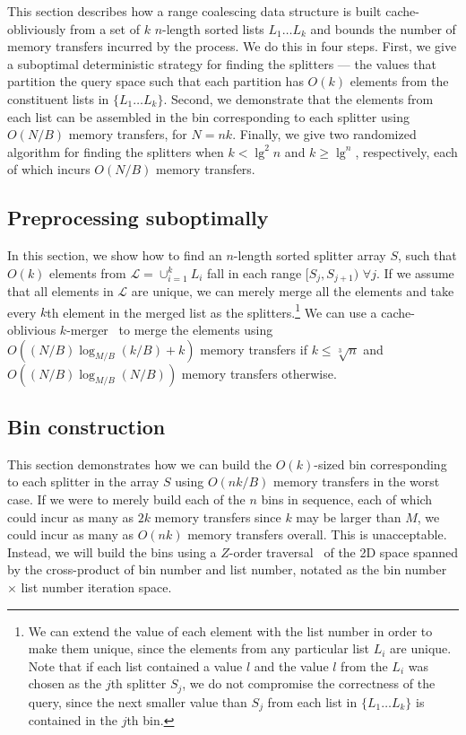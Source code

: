 
This section describes how a range coalescing data structure is built cache-obliviously
from a set of $k$ $n$-length sorted lists $L_1 \ldots L_k$ and bounds
the number of memory transfers incurred by the process.  We do this in four steps.
First, we give a suboptimal deterministic strategy for finding the splitters 
--- the values that partition the query space such that each partition has $O(k)$ 
elements from the constituent lists in $\{ L_1 \ldots L_k \}$.  Second, we 
demonstrate that the elements from each list can be assembled in the bin corresponding
to each splitter using $O(N / B)$ memory transfers, for $N=nk$.  
Finally, we give two randomized algorithm for finding the splitters when 
$k < \lg^2 n$ and $k \geq \lg^ n$, 
respectively, each of which incurs $O(N/B)$ memory transfers.  

\subsection*{Preprocessing suboptimally}

In this section, we show how to find an $n$-length sorted splitter array $S$, such that $O(k)$
elements from $\mathcal{L} = \cup_{i=1}^{k}L_i$ fall in each range 
$[S_j,S_{j+1})$ $\forall j$.  If we assume that all elements in $\mathcal{L}$ are 
unique, we can merely merge all the elements and take every $k$th element in the
merged list as the splitters.\footnote{We can extend the value of each element with the
list number in order to make them unique, since the elements from any particular
list $L_i$ are unique.  Note that if each list contained a value $l$ and the
value $l$ from
the $L_i$ was chosen as the $j$th splitter $S_j$, we do not compromise the correctness of the 
query, since the next smaller value than $S_j$ from each list in $\{ L_1 \ldots L_k\}$ is 
contained in the $j$th bin.} We can use a cache-oblivious 
$k$-merger~\cite{FrigoLePr99} to merge the elements using 
$O((N/B) \log_{M/B} (k/B) + k)$ memory transfers if $k \leq \sqrt[3]{n}$ and
$O((N/B) \log_{M/B} (N/B))$ memory transfers otherwise.



\subsection*{Bin construction}

This section demonstrates how we can build the $O(k)$-sized bin corresponding to each splitter
in the array $S$ using $O(nk/B)$ memory transfers in the worst case.
If we were to merely build each of the $n$ bins in sequence, each of which could
incur as many as $2k$ memory transfers since $k$ may be larger than $M$, we could
incur as many as $O(nk)$ memory transfers overall.  This is unacceptable.  
Instead, we will build the bins using a $Z$-order traversal~\cite{Morton66} of 
the 2D space spanned by the cross-product of bin number and list number, notated
as the bin number $\times$ list number iteration space.

